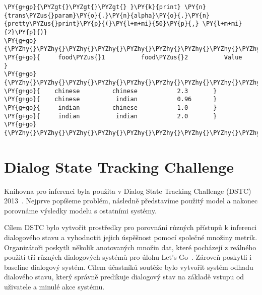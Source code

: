 \begin{example}
\begin{Verbatim}[commandchars=\\\{\}]
\PY{g+gp}{\PYZgt{}\PYZgt{}\PYZgt{} }\PY{k}{print} \PY{n}{trans\PYZus{}param}\PY{o}{.}\PY{n}{alpha}\PY{o}{.}\PY{n}{pretty\PYZus{}print}\PY{p}{(}\PY{l+m+mi}{50}\PY{p}{,} \PY{l+m+mi}{2}\PY{p}{)}
\PY{g+go}{\PYZhy{}\PYZhy{}\PYZhy{}\PYZhy{}\PYZhy{}\PYZhy{}\PYZhy{}\PYZhy{}\PYZhy{}\PYZhy{}\PYZhy{}\PYZhy{}\PYZhy{}\PYZhy{}\PYZhy{}\PYZhy{}\PYZhy{}\PYZhy{}\PYZhy{}\PYZhy{}\PYZhy{}\PYZhy{}\PYZhy{}\PYZhy{}\PYZhy{}\PYZhy{}\PYZhy{}\PYZhy{}\PYZhy{}\PYZhy{}\PYZhy{}\PYZhy{}\PYZhy{}\PYZhy{}\PYZhy{}\PYZhy{}\PYZhy{}\PYZhy{}\PYZhy{}\PYZhy{}\PYZhy{}\PYZhy{}\PYZhy{}\PYZhy{}\PYZhy{}\PYZhy{}\PYZhy{}\PYZhy{}\PYZhy{}\PYZhy{}}
\PY{g+go}{     food\PYZus{}1          food\PYZus{}2          Value      }
\PY{g+go}{\PYZhy{}\PYZhy{}\PYZhy{}\PYZhy{}\PYZhy{}\PYZhy{}\PYZhy{}\PYZhy{}\PYZhy{}\PYZhy{}\PYZhy{}\PYZhy{}\PYZhy{}\PYZhy{}\PYZhy{}\PYZhy{}\PYZhy{}\PYZhy{}\PYZhy{}\PYZhy{}\PYZhy{}\PYZhy{}\PYZhy{}\PYZhy{}\PYZhy{}\PYZhy{}\PYZhy{}\PYZhy{}\PYZhy{}\PYZhy{}\PYZhy{}\PYZhy{}\PYZhy{}\PYZhy{}\PYZhy{}\PYZhy{}\PYZhy{}\PYZhy{}\PYZhy{}\PYZhy{}\PYZhy{}\PYZhy{}\PYZhy{}\PYZhy{}\PYZhy{}\PYZhy{}\PYZhy{}\PYZhy{}\PYZhy{}\PYZhy{}}
\PY{g+go}{    chinese         chinese           2.3       }
\PY{g+go}{    chinese          indian           0.96      }
\PY{g+go}{     indian         chinese           1.0       }
\PY{g+go}{     indian          indian           2.0       }
\PY{g+go}{\PYZhy{}\PYZhy{}\PYZhy{}\PYZhy{}\PYZhy{}\PYZhy{}\PYZhy{}\PYZhy{}\PYZhy{}\PYZhy{}\PYZhy{}\PYZhy{}\PYZhy{}\PYZhy{}\PYZhy{}\PYZhy{}\PYZhy{}\PYZhy{}\PYZhy{}\PYZhy{}\PYZhy{}\PYZhy{}\PYZhy{}\PYZhy{}\PYZhy{}\PYZhy{}\PYZhy{}\PYZhy{}\PYZhy{}\PYZhy{}\PYZhy{}\PYZhy{}\PYZhy{}\PYZhy{}\PYZhy{}\PYZhy{}\PYZhy{}\PYZhy{}\PYZhy{}\PYZhy{}\PYZhy{}\PYZhy{}\PYZhy{}\PYZhy{}\PYZhy{}\PYZhy{}\PYZhy{}\PYZhy{}\PYZhy{}\PYZhy{}}
\end{Verbatim}
\end{example}


\section{Dialog State Tracking Challenge}

Knihovna pro inferenci byla použita v Dialog State Tracking Challenge (DSTC) 2013~\cite{dstc2013}.
Nejprve popíšeme problém, následně představíme použitý model a nakonec porovnáme výsledky modelu s ostatními systémy.

Cílem DSTC bylo vytvořit prostředky pro porovnání různých přístupů k inferenci dialogového stavu a vyhodnotit jejich úspěšnost pomocí společné množiny metrik.
Organizátoři poskytli několik anotovaných množin dat, které pocházejí z reálného použití tří různých dialogových systémů pro úlohu Let's Go~\cite{raux2005let}.
Zároveň poskytli i baseline dialogový systém.
Cílem účastníků soutěže bylo vytvořit systém odhadu dialového stavu, který správně predikuje dialogový stav na základě vstupu od uživatele a minulé akce systému.


